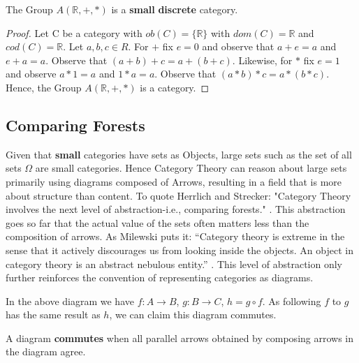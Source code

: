 \documentclass{article}
\begin{document}
\begin{theorem}
The Group $A(\mathbb{R}, +, *)$ is a \textbf{small} \textbf{discrete} category.
\end{theorem}
\begin{proof}
Let C be a category with $ob(C)=\{\mathbb{R}\}$ with $dom(C) = \mathbb{R}$ and $cod(C) = \mathbb{R}$. Let $a,b,c \in R$. For $+$ fix $e = 0$ and observe that $a + e = a$ and $e + a = a$. Observe that $(a+b) + c = a + (b+c)$. Likewise, for $*$ fix $e = 1$ and observe $a * 1 = a$ and $1 * a =a$. Observe that $(a*b)*c = a*(b*c)$. Hence, the Group $A(\mathbb{R},+,*)$ is a category.
\end{proof}

\subsection{Comparing Forests}
Given that \textbf{small} categories have sets as Objects, large sets such as the set of all sets $\Omega$ are small categories. Hence Category Theory can reason about large sets primarily using diagrams composed of Arrows, resulting in a field that is more about structure than content. To quote Herrlich and Strecker: "Category Theory involves the next level of abstraction-i.e., comparing forests." \cite{Herrlich01}. This abstraction goes so far that the actual value of the sets often matters less than the composition of arrows. As Milewski puts it: “Category theory is extreme in the sense that it actively discourages us from looking inside the objects. An object in category theory is an abstract nebulous entity.” \cite{Milewski01}. This level of abstraction only further reinforces the convention of representing categories as diagrams.

\begin{center}
\end{center}
In the above diagram we have $f: A \to B$, $g: B\to C$, $h = g \circ f$. As following $f$ to $g$ has the same result as $h$, we can claim this diagram commutes.

\begin{definition}
    A diagram \textbf{commutes} when all parallel arrows obtained by composing arrows in the diagram agree.
\end{definition}
\end{document}

